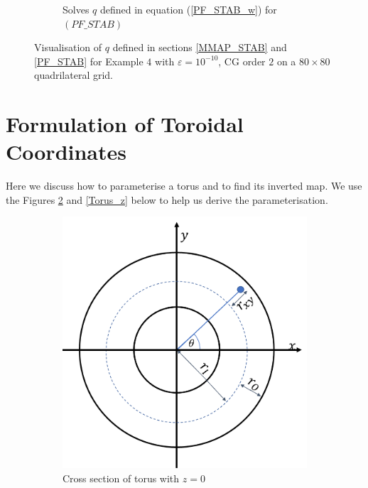 \documentclass[12pt]{ociamthesis}
\begin{document}
\begin{figure}[H]
\begin{subfigure}{0.5\textwidth}
     \caption{Solves $q$ defined in equation (\ref{PF_STAB_w}) for $(PF\_STAB)$}
 \end{subfigure}
 \caption{Visualisation of $q$ defined in sections \ref{MMAP_STAB} and \ref{PF_STAB} for Example $4$ with $\varepsilon = 10^{-10}$, CG order $2$ on a $80 \times 80$ quadrilateral grid.} \label{E3_Q}
\end{figure}

\section{Formulation of Toroidal Coordinates} \label{Form_Toro}
Here we discuss how to parameterise a torus and to find its inverted map. We use the Figures \ref{Torus_XY} and \ref{Torus_z} below to help us derive the parameterisation.
\begin{figure}[H]
 \begin{subfigure}{0.5\textwidth}
     \includegraphics[width=\textwidth]{Pics/TorusCordsXY.png}
     \caption{Cross section of torus with $z=0$}
     \label{Torus_XY}
 \end{subfigure}
 \hfill
 \begin{subfigure}{0.5\textwidth}

\end{subfigure}
\end{figure}
\end{document}
